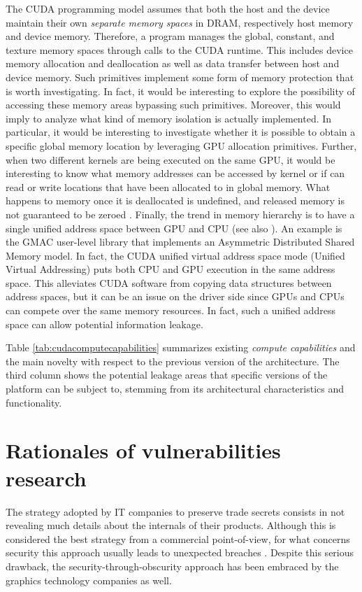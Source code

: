 \documentclass[11pt,onecolumn,letterpaper]{IEEEtran}
\begin{document}
The CUDA programming model assumes that both the host and the device maintain their own \emph{separate memory spaces} in DRAM,
respectively host memory and device memory.
Therefore, a program manages the global, constant, and texture memory spaces through calls to the CUDA runtime.
This includes device memory allocation and deallocation as well as data transfer between host and device memory.
Such primitives implement some form of memory protection that is worth investigating.
In fact, it would be interesting to explore the possibility of accessing these memory areas bypassing such primitives.
Moreover, this would imply to analyze what kind of memory isolation is actually implemented.
In particular, it would be interesting to investigate whether it is possible to obtain a specific global memory location by leveraging GPU allocation primitives.
Further, when two different kernels  are being executed on the same GPU,
it would be interesting to know what memory addresses can be accessed by kernel 
or if  can read or write locations that have been allocated to  in global memory.
What happens to memory once it is deallocated is undefined, and released memory is not guaranteed to be zeroed \cite{zeroizzazione, zeroizzazione2}.
Finally, the trend in memory hierarchy is to have a single unified address space between GPU and CPU (see also \cite{cudadevguide}).
An example is the GMAC \cite{gmac} user-level library that implements an Asymmetric Distributed Shared Memory model.
In fact, the CUDA unified virtual address space mode (Unified Virtual Addressing) puts both CPU and GPU execution in the same address space.
This alleviates CUDA software from copying data structures between address spaces, 
but it can be an issue on the driver side since GPUs and CPUs can compete over the same memory resources.
In fact, such a unified address space can allow potential information leakage. 

Table \ref{tab:cudacomputecapabilities} summarizes existing \textit{compute capabilities}
and the main novelty with respect to the previous version of the architecture.
The third column shows the potential leakage areas that specific versions of the platform can be subject to,
stemming from its architectural characteristics and functionality.

\section{Rationales of vulnerabilities research}
\label{ourapproach}

The strategy adopted by IT companies to preserve trade secrets consists in not revealing much details
about the internals of their products.
Although this is considered the best strategy from a commercial point-of-view, for what concerns security 
this approach usually leads to unexpected breaches \cite{securitythroughobscurity}.
Despite this serious drawback, the security-through-obscurity approach has been embraced by the graphics technology companies as well.
\end{document}
